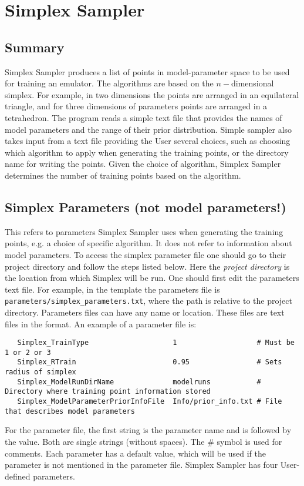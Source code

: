 \documentclass[main.tex]{subfiles}
\begin{document}
\newpage
\setcounter{section}{2}

\section{Simplex Sampler}

\subsection{Summary}
Simplex Sampler produces a list of points in model-parameter space to be used for training an emulator. The algorithms are based on the $n-$dimensional simplex. For example, in two dimensions the points are arranged in an equilateral triangle, and for three dimensions of parameters points are arranged in a tetrahedron. The program reads a simple text file that provides the names of model parameters and the range of their prior distribution. Simple sampler also takes input from a text file providing the User several choices, such as choosing which algorithm to apply when generating the training points, or the directory name for writing the points. Given the choice of algorithm, Simplex Sampler determines the number of training points based on the algorithm.

\subsection{Simplex Parameters (not model parameters!)}

This refers to parameters Simplex Sampler uses when generating the training points, e.g. a choice of specific algorithm. It does not refer to information about model parameters. To access the simplex parameter file one should go to their project directory and follow the steps listed below. Here the {\it project directory} is the location from which Simplex will be run. One should first edit the parameters text file. For example, in the template the parameters file is {\tt parameters/simplex\_parameters.txt}, where the path is relative to the project directory.
Parameters files can have any name or location. These files are text files in the format. An example of a parameter file is:\\
{\tt\begin{verbatim}
   Simplex_TrainType                    1                   # Must be 1 or 2 or 3
   Simplex_RTrain                       0.95                # Sets radius of simplex
   Simplex_ModelRunDirName              modelruns           # Directory where training point information stored
   Simplex_ModelParameterPriorInfoFile  Info/prior_info.txt # File that describes model parameters
\end{verbatim}
}
For the parameter file, the first string is the parameter name and is followed by the value. Both are single strings (without spaces). The \# symbol is used for comments. Each parameter has a default value, which will be used if the parameter is not mentioned in the parameter file.  Simplex Sampler has four User-defined parameters.
    
\end{document}

